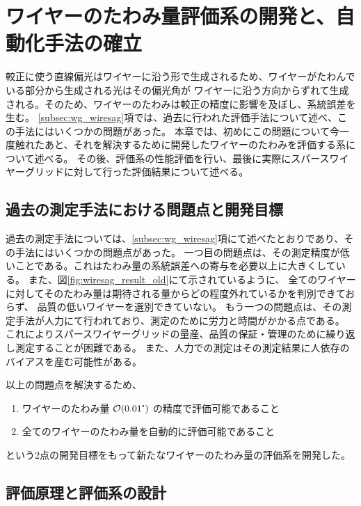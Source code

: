 \documentclass[../../main.tex]{subfiles}
\begin{document}
\chapter{ワイヤーのたわみ量評価系の開発と、自動化手法の確立}
\label{chap:wiresag}
較正に使う直線偏光はワイヤーに沿う形で生成されるため、ワイヤーがたわんでいる部分から生成される光はその偏光角が
ワイヤーに沿う方向からずれて生成される。そのため、ワイヤーのたわみは較正の精度に影響を及ぼし、系統誤差を生む。
\ref{subsec:wg_wiresag}項では、過去に行われた評価手法について述べ、この手法にはいくつかの問題があった。
本章では、初めにこの問題について今一度触れたあと、それを解決するために開発したワイヤーのたわみを評価する系について述べる。
その後、評価系の性能評価を行い、最後に実際にスパースワイヤーグリッドに対して行った評価結果について述べる。

\section{過去の測定手法における問題点と開発目標}

過去の測定手法については、\ref{subsec:wg_wiresag}項にて述べたとおりであり、その手法にはいくつかの問題点があった。
一つ目の問題点は、その測定精度が低いことである。これはたわみ量の系統誤差への寄与を必要以上に大きくしている。
また、図\ref{fig:wiresag_result_old}にて示されているように、
全てのワイヤーに対してそのたわみ量は期待される量からどの程度外れているかを判別できておらず、
品質の低いワイヤーを選別できていない。
もう一つの問題点は、その測定手法が人力にて行われており、測定のために労力と時間がかかる点である。
これによりスパースワイヤーグリッドの量産、品質の保証・管理のために繰り返し測定することが困難である。
また、人力での測定はその測定結果に人依存のバイアスを産む可能性がある。

以上の問題点を解決するため、
\begin{enumerate}
    \item ワイヤーのたわみ量 $\order{0.01\tcdegree}$ の精度で評価可能であること
    \item 全てのワイヤーのたわみ量を自動的に評価可能であること
\end{enumerate}
という2点の開発目標をもって新たなワイヤーのたわみ量の評価系を開発した。

\section{評価原理と評価系の設計}
\end{document}
